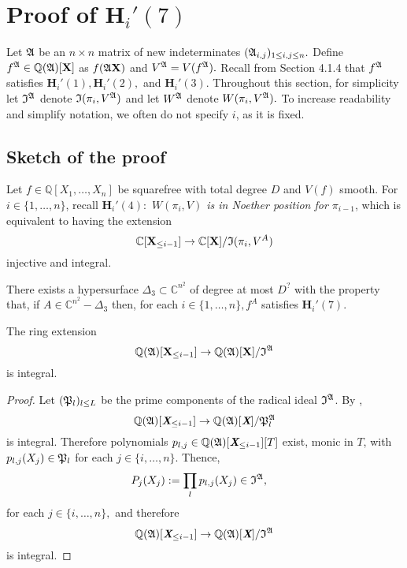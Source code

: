 \documentclass[sigconf]{acmart}
\def\Xb{\textit{\textbf{X}}}
\def\C{\mathbb{C}}
\def\I{\frak{I}}
\def\A{\frak{A}}
\def\fp{\frak{P}}
\begin{document}
\section{Proof of $\textbf{H}_i'(7)$}
%
Let $\A$ be an $n \times n$ matrix of new indeterminates $(\A_{i,j})_{1 \leq i , j \leq n}.$ Define $f^{\A} \in \mathbb{Q}(\A)[\textbf{X}]$ as $f(\A\textbf{X})$ and $V^\A=V(f^\A).$ Recall from Section 4.1.4 that $f^\A$ satisfies $\textbf{H}_i'(1),\textbf{H}_i'(2),$ and $\textbf{H}_i'(3).$ Throughout this section, for simplicity let $\I^\A$ denote $\I(\pi_i,V^\A)$ and let $W^\A$ denote $W(\pi_i,V^\A).$ To increase readability and simplify notation, we often do not specify $i$, as it is fixed.   
\subsection{Sketch of the proof}
Let $f \in \mathbb{Q}[X_1,\hdots,X_n]$ be squarefree with total degree $D$ and $V(f)$ smooth. For $i \in \{1,\hdots,n\}$, recall $\textbf{H}_i'(4):$ \textit{$W(\pi_i,V)$ is in Noether position for $\pi_{i-1}$}, which is equivalent to having the extension  
\[
\C[\textbf{X}_{\leq i-1}]\rightarrow\C[\textbf{X}]/\frak{I}(\pi_i,V^A)
\]
injective and  integral.
%
\begin{theorem}
There exists a hypersurface $\Delta_3 \subset \C^{n^2}$ of degree at most $D^{?}$ with the property that, if $A \in \C^{n^2} - \Delta_3$ then, for each $i \in\{1,\hdots,n\}, f^A$ satisfies $\textbf{H}_i'(7)$.
\end{theorem}
%
\begin{proposition} 
The ring extension \[\mathbb{Q}(\frak{A})[\textbf{X}_{\leq i-1}]\rightarrow\mathbb{Q}(\frak{A})[\textbf{X}]/\I^{\A}\] is integral.
\end{proposition}
%
\begin{proof}
Let $(\frak{P}_l)_{l \leq L}$ be the prime components of the radical ideal $\I^\A$. By \cite[Proposition 1]{EMP}, 
\[
\mathbb{Q}(\frak{A})[\textit{\textbf{X}}_{\leq i-1}]\rightarrow\mathbb{Q}(\frak{A})[\textit{\textbf{X}}]/\fp_l^{\A}
\] 
is integral. Therefore polynomials $p_{l,j}\in\mathbb{Q}(\frak{A})[\Xb_{\leq i-1}][T]$ exist, monic in $T$, with $p_{l,j}(X_j)\in \frak{P}_l$ for each $j\in \{i,\hdots,n\}.$ Thence, 
%
\begin{align*}
&P_{j}(X_j) := \prod_l p_{l,j}(X_j)\in\I^\A, 
\end{align*}
%
for each $j \in \{i,\hdots,n\},$ and therefore 
\[
\mathbb{Q}(\frak{A})[\textit{\textbf{X}}_{\leq i-1}]\rightarrow\mathbb{Q}(\frak{A})[\textit{\textbf{X}}]/\I^{\A}
\] 
is integral.
\end{proof}
\end{document}
